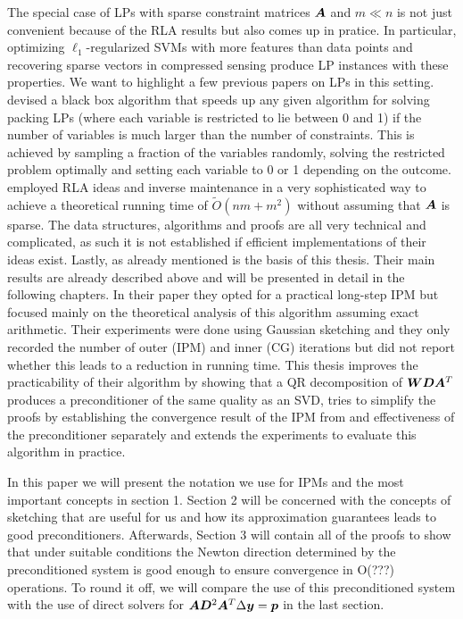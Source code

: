 The special case of LPs with sparse constraint matrices \(\bm{A}\) and \(m \ll n\) is not just convenient because of the RLA results but also comes up in pratice.
In particular, optimizing \(\ell_1\)-regularized SVMs \cite{ZhuRossetTibshiraniHastie-1normSupportVectorMachines} with more features than data points and recovering sparse vectors in compressed sensing \cite{YangZhang-l1ProblemsInCompressiveSensing} produce LP instances with these properties.
We want to highlight a few previous papers on LPs in this setting. \textcite{LondonVardiWiermanYi-PackingLinearPrograms} devised a black box algorithm that speeds up any given algorithm for solving packing LPs (where each variable is restricted to lie between 0 and 1) if the number of variables is much larger than the number of constraints.
This is achieved by sampling a fraction of the variables randomly, solving the restricted problem optimally and setting each variable to 0 or 1 depending on the outcome.
\textcite{Sidford-TallDenseLinearPrograms} employed RLA ideas and inverse maintenance in a very sophisticated way to achieve a theoretical running time of \(\tilde{O}(nm + m^2)\) without assuming that \(\bm{A}\) is sparse.
The data structures, algorithms and proofs are all very technical and complicated, as such it is not established if efficient implementations of their ideas exist.
Lastly, as already mentioned \cite{Avron-FasterRandomizedInfeasibleIPMs} is the basis of this thesis.
Their main results are already described above and will be presented in detail in the following chapters.
In their paper they opted for a practical long-step IPM but focused mainly on the theoretical analysis of this algorithm assuming exact arithmetic.
Their experiments were done using Gaussian sketching and they only recorded the number of outer (IPM) and inner (CG) iterations but did not report whether this leads to a reduction in running time.
This thesis improves the practicability of their algorithm by showing that a QR decomposition of \(\bm{W} \bm{D} \bm{A}^T\) produces a preconditioner of the same quality as an SVD, tries to simplify the proofs by establishing the convergence result of the IPM from \cite{Monteiro-ConvergenceAnalysisLongStepInfeasibleIPMs} and effectiveness of the preconditioner separately and extends the experiments to evaluate this algorithm in practice.

In this paper we will present the notation we use for IPMs and the most important concepts in section 1.
Section 2 will be concerned with the concepts of sketching that are useful for us and how its approximation guarantees leads to good preconditioners.
Afterwards, Section 3 will contain all of the proofs to show that under suitable conditions the Newton direction determined by the preconditioned system is good enough to ensure convergence in O(???) operations.
To round it off, we will compare the use of this preconditioned system with the use of direct solvers for \(\bm{A}\bm{D}^2\bm{A}^T \Delta \bm{y} = \bm{p}\) in the last section.